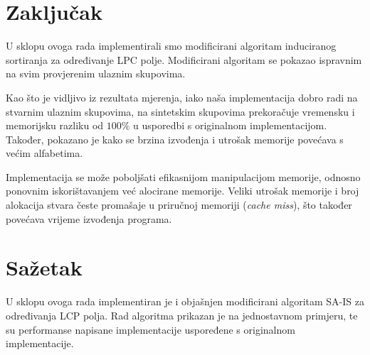 \documentclass[times, utf8, proizvoljni, numeric]{fer}
\begin{document}
\chapter{Zaključak}

U sklopu ovoga rada implementirali smo modificirani algoritam induciranog sortiranja za određivanje LPC polje.
Modificirani algoritam se pokazao ispravnim na svim provjerenim ulaznim skupovima.

Kao što je vidljivo iz rezultata mjerenja, iako naša implementacija dobro radi na stvarnim ulaznim skupovima, na sintetskim skupovima prekoračuje vremensku i memorijsku razliku od $100\%$ u usporedbi s originalnom implementacijom.
Također, pokazano je kako se brzina izvođenja i utrošak memorije povećava s većim alfabetima.

Implementacija se može poboljšati efikasnijom manipulacijom memorije, odnosno ponovnim iskorištavanjem već alocirane memorije.
Veliki utrošak memorije i broj alokacija stvara česte promašaje u priručnoj memoriji (\textit{cache miss}), što također povećava vrijeme izvođenja programa.




\chapter{Sažetak}

U sklopu ovoga rada implementiran je i objašnjen modificirani algoritam SA-IS za  određivanja LCP polja.
Rad algoritma prikazan je na jednostavnom primjeru, te su performanse napisane implementacije uspoređene s originalnom implementacije.
\end{document}

